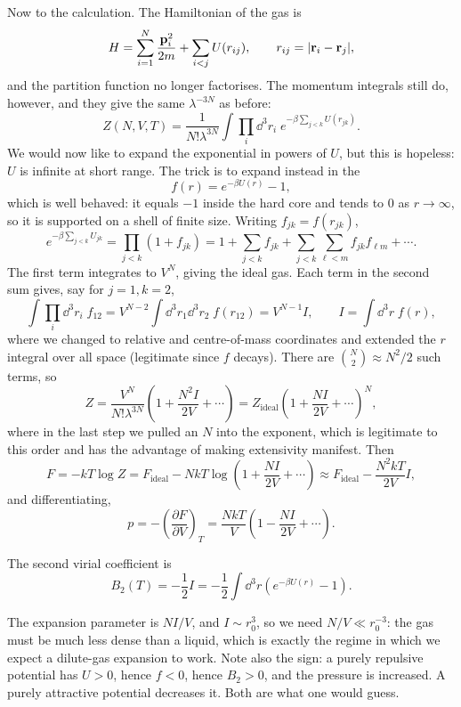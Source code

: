 \documentclass[a4paper]{scrartcl}
\begin{document}
Now to the calculation. The Hamiltonian of the gas is
$$
H = \sum_{i=1}^N \frac{\mathbf{p}_i^2}{2m} + \sum_{i < j} U(r_{ij}), \qquad r_{ij} = |\mathbf{r}_i - \mathbf{r}_j|,
$$
and the partition function no longer factorises. The momentum integrals still do, however, and they give the same $\lambda^{-3N}$ as before:
$$
Z(N,V,T) = \frac{1}{N!\lambda^{3N}}\int \prod_i \dd^3 r_i \; e^{-\beta\sum_{j<k}U(r_{jk})}.
$$
We would now like to expand the exponential in powers of $U$, but this is hopeless: $U$ is infinite at short range. The trick is to expand instead in the 
$$
f(r) = e^{-\beta U(r)} - 1,
$$
which is well behaved: it equals $-1$ inside the hard core and tends to $0$ as $r \to \infty$, so it is supported on a shell of finite size. Writing $f_{jk} = f(r_{jk})$,
$$
e^{-\beta\sum_{j<k}U_{jk}} = \prod_{j<k}(1+f_{jk}) = 1 + \sum_{j<k}f_{jk} + \sum_{j<k}\sum_{\ell<m}f_{jk}f_{\ell m} + \cdots.
$$
The first term integrates to $V^N$, giving the ideal gas. Each term in the second sum gives, say for $j=1,k=2$,
$$
\int \prod_i \dd^3 r_i \; f_{12} = V^{N-2}\int \dd^3 r_1 \dd^3 r_2 \; f(r_{12}) = V^{N-1} I, \qquad I = \int \dd^3 r\; f(r),
$$
where we changed to relative and centre-of-mass coordinates and extended the $r$ integral over all space (legitimate since $f$ decays). There are $\binom N2 \approx N^2/2$ such terms, so
$$
Z = \frac{V^N}{N!\lambda^{3N}}\left(1 + \frac{N^2 I}{2V} + \cdots\right) = Z_{\mathrm{ideal}}\left(1 + \frac{NI}{2V}+\cdots\right)^N,
$$
where in the last step we pulled an $N$ into the exponent, which is legitimate to this order and has the advantage of making extensivity manifest. Then
$$
F = -kT\log Z = F_{\mathrm{ideal}} - NkT\log\left(1 + \frac{NI}{2V}+\cdots\right) \approx F_{\mathrm{ideal}} - \frac{N^2 kT}{2V}I,
$$
and differentiating,
$$
p = -\left(\frac{\partial F}{\partial V}\right)_T = \frac{NkT}{V}\left(1 - \frac{NI}{2V}+\cdots\right).
$$

\begin{proposition}
	The second virial coefficient is
	$$
	B_2(T) = -\frac 12 I = -\frac 12\int \dd^3 r \left(e^{-\beta U(r)}-1\right).
	$$
\end{proposition}

The expansion parameter is $NI/V$, and $I \sim r_0^3$, so we need $N/V \ll r_0^{-3}$: the gas must be much less dense than a liquid, which is exactly the regime in which we expect a dilute-gas expansion to work. Note also the sign: a purely repulsive potential has $U > 0$, hence $f < 0$, hence $B_2 > 0$, and the pressure is increased. A purely attractive potential decreases it. Both are what one would guess.
\end{document}
